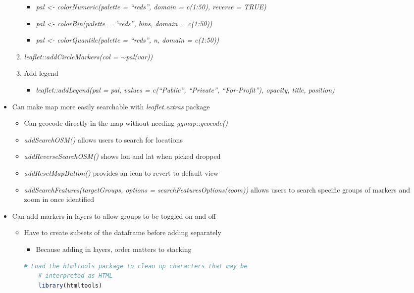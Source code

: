\documentclass{article}
\begin{document}
\begin{itemize}
\begin{enumerate}
\begin{itemize}
            \item \textit{pal \textless- colorNumeric(palette = ``reds'', domain = c(1:50), reverse = TRUE)}
            \item \textit{pal \textless- colorBin(palette = ``reds'', bins, domain = c(1:50))}
            \item \textit{pal \textless- colorQuantile(palette = ``reds'', n, domain = c(1:50))}
        \end{itemize}
        \item \textit{leaflet::addCircleMarkers(col = $\sim$pal(var))}
        \item Add legend
        \begin{itemize}
            \item \textit{leaflet::addLegend(pal = pal, values = c(``Public'', ``Private'', ``For-Profit''), opacity, title, position)}
        \end{itemize}
    \end{enumerate}
    \item Can make map more easily searchable with \textit{leaflet.extras} package
    \begin{itemize}
        \item Can geocode directly in the map without needing \textit{ggmap::geocode()}
        \item \textit{addSearchOSM()} allows users to search for locations
        \item \textit{addReverseSearchOSM()} shows lon and lat when picked dropped
        \item \textit{addResetMapButton()} provides an icon to revert to default view
        \item \textit{addSearchFeatures(targetGroups, options = searchFeaturesOptions(zoom))} allows users to search specific groups of markers and zoom in once identified
    \end{itemize}
    \item Can add markers in layers to allow groups to be toggled on and off
    \begin{itemize}
        \item Have to create subsets of the dataframe before adding separately
        \begin{itemize}
            \item Because adding in layers, order matters to stacking
        \end{itemize}

\begin{lstlisting}[language=R]
    # Load the htmltools package to clean up characters that may be 
    # interpreted as HTML
    library(htmltools)


\end{lstlisting}
\end{itemize}
\end{itemize}
\end{document}
